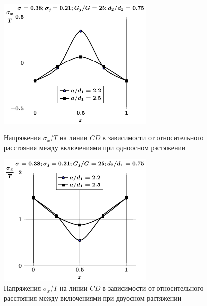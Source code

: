 \begin{russian}
\begin{figure}[h!]
\centering\footnotesize
\parbox[b]{7.5cm}{\centering\includegraphics[width=7.6cm]{inc13-a-d75-g25-t1-sig_x-cd.pdf}
\caption{Напряжения $\sigma_x/T$ на линии $CD$ в зависимости от относительного расстояния между включениями при одноосном растяжении
\label{f:9:81}}}\hfil\hfil
\parbox[b]{7.5cm}{\centering\includegraphics[width=7.6cm]{inc13-a-d75-g25-t2-sig_x-cd.pdf}
\caption{Напряжения $\sigma_x/T$ на линии $CD$ в зависимости от относительного расстояния между включениями при двуосном растяжении
\label{f:9:82}}}
\end{figure}


\end{russian}
